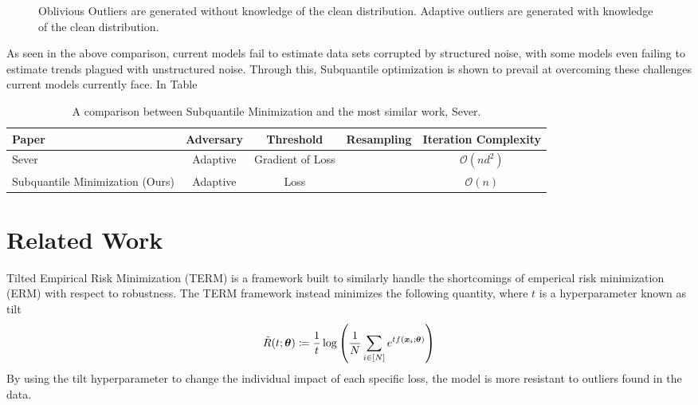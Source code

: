 \documentclass{article} %
\newcommand{\cmark}{\ding{51}}%
\newcommand{\xmark}{\ding{55}}%
\begin{document}
\begin{figure}[!t]
		\caption{Oblivious Outliers are generated without knowledge of the clean distribution. Adaptive outliers are generated with knowledge of the clean distribution.}
		\label{fig:structure-unstructured-noise}
	\end{figure}
	
	As seen in the above comparison, current models fail to estimate data sets corrupted by structured noise, with some models even failing to estimate trends plagued with unstructured noise. Through this, Subquantile optimization is shown to prevail at overcoming these challenges current models currently face. In Table 
	
	\begin{table}[!h]
		\centering
		\begin{tabular}{lcccc}
			\toprule 
			Paper & Adversary & Threshold & Resampling & Iteration Complexity\\   
			\midrule                
			Sever \cite{DiakonikolasKKLSS19} & Adaptive & Gradient of Loss & \xmark & $\mathcal{O}(nd^2)$\\
			\midrule 
			Subquantile Minimization (Ours) & Adaptive & Loss & \cmark & $\mathcal{O}(n)$\\
			\bottomrule
		\end{tabular}
		\caption{A comparison between Subquantile Minimization and the most similar work, Sever. }
		\label{tab:related-work}
	\end{table}
	
	\section{Related Work}
	
	Tilted Empirical Risk Minimization (TERM) \cite{li2020tilted} is a framework built to similarly handle the shortcomings of emperical risk minimization (ERM) with respect to robustness. The TERM framework instead minimizes the following quantity, where $t$ is a hyperparameter known as tilt
	\begin{equation}
		\tilde{R}(t;{\bm{\theta}}) \coloneqq \frac{1}{t} \log\left(\frac{1}{N}\sum_{i \in \left[N\right]}e^{tf({\bm{x}}_i;{\bm{\theta}})} \right)
	\end{equation}
	By using the tilt hyperparameter to change the individual impact of each specific loss, the model is more resistant to outliers found in the data.
	
\end{document}

